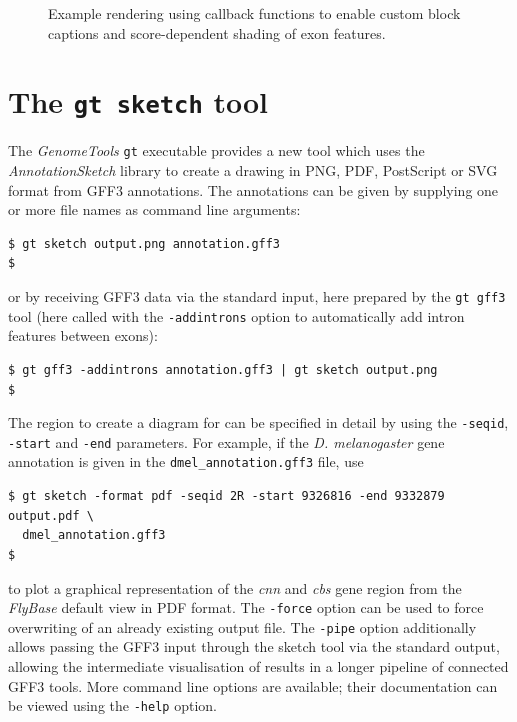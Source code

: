 \documentclass[a4paper]{scrreprt}
\begin{document}
\begin{figure}
\caption{Example rendering using callback functions to enable custom block captions and score-dependent shading of exon features.}
\label{callbacks}
\end{figure}

\section{The \texttt{gt sketch} tool}

The \emph{GenomeTools} \texttt{gt} executable provides a new tool which uses the \emph{AnnotationSketch} library to create a drawing in PNG, PDF, PostScript or SVG format from GFF3 annotations. The annotations can be given by supplying one or more file names as command line arguments:
\small
\medskip
\begin{verbatim}
$ gt sketch output.png annotation.gff3
$
\end{verbatim}
\normalsize
\medskip
or by receiving GFF3 data via the standard input, here prepared by the \texttt{gt gff3} tool (here called with the \texttt{-addintrons} option to automatically add intron features between exons):
\small
\medskip
\begin{verbatim}
$ gt gff3 -addintrons annotation.gff3 | gt sketch output.png
$
\end{verbatim}
\normalsize
\medskip
The region to create a diagram for can be specified in detail by using the \texttt{-seqid}, \texttt{-start} and \texttt{-end} parameters. For example, if the \emph{D. melanogaster} gene annotation is given in the \texttt{dmel\_annotation.gff3} file, use
\small
\medskip
\begin{verbatim}
$ gt sketch -format pdf -seqid 2R -start 9326816 -end 9332879 output.pdf \
  dmel_annotation.gff3
$
\end{verbatim}
\normalsize
\medskip
to plot a graphical representation of the \emph{cnn} and \emph{cbs} gene region from the \emph{FlyBase} default view in PDF format.
The \texttt{-force} option can be used to force overwriting of an already existing output file. The \texttt{-pipe} option additionally allows passing the GFF3 input through the sketch tool via the standard output, allowing the intermediate visualisation of results in a longer pipeline of connected GFF3 tools. More command line options are available; their documentation can be viewed using the \texttt{-help} option.
\end{document}
